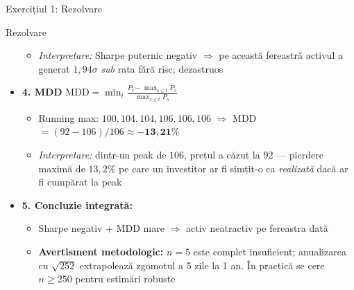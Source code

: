 \documentclass[9pt, aspectratio=169, t]{beamer}
\begin{document}
\begin{frame}[shrink=25]{Exercițiul 1: Rezolvare}
\begin{cminipage}{0.95\textwidth}
\begin{exampleblock}{Rezolvare}
\begin{itemize}
\begin{itemize}
        \item \textit{Interpretare:} Sharpe puternic negativ $\Rightarrow$ pe această fereastră activul a generat $1{,}94\sigma$ \emph{sub} rata fără risc; dezastruos
    \end{itemize}
    \item \textbf{4. MDD} \quad $\text{MDD} = \min_t \frac{P_t - \max_{s \le t} P_s}{\max_{s \le t} P_s}$
    \begin{itemize}\setlength{\itemsep}{0pt}
        \item Running max: $100, 104, 104, 106, 106, 106$ $\Rightarrow$ MDD $= (92 - 106)/106 \approx \mathbf{-13{,}21\%}$
        \item \textit{Interpretare:} dintr-un peak de $106$, prețul a căzut la $92$ --- pierdere maximă de $13{,}2\%$ pe care un investitor ar fi simțit-o ca \emph{realizată} dacă ar fi cumpărat la peak
    \end{itemize}
    \item \textbf{5. Concluzie integrată:}
    \begin{itemize}\setlength{\itemsep}{0pt}
        \item Sharpe negativ + MDD mare $\Rightarrow$ activ neatractiv pe fereastra dată
        \item \textbf{Avertisment metodologic:} $n = 5$ este complet insuficient; anualizarea cu $\sqrt{252}$ extrapolează zgomotul a 5 zile la 1 an. În practică se cere $n \ge 250$ pentru estimări robuste
    \end{itemize}
\end{itemize}
\end{exampleblock}
\end{cminipage}
\end{frame}
\end{document}
